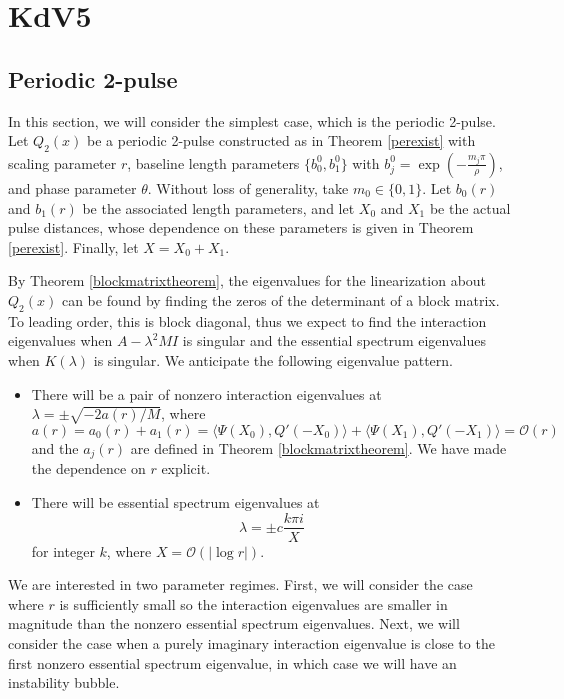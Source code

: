 \documentclass[thesis.tex]{subfiles}
\begin{document}
\chapter{KdV5}

\section{Periodic 2-pulse}

In this section, we will consider the simplest case, which is the periodic 2-pulse. Let $Q_2(x)$ be a periodic 2-pulse constructed as in Theorem \ref{perexist} with scaling parameter $r$, baseline length parameters $\{b_0^0, b_1^0 \}$ with $b_j^0 = \exp\left(-\frac{m_j \pi}{\rho}\right)$, and phase parameter $\theta$. Without loss of generality, take $m_0 \in \{0, 1\}$. Let $b_0(r)$ and $b_1(r)$ be the associated length parameters, and let $X_0$ and $X_1$ be the actual pulse distances, whose dependence on these parameters is given in Theorem \ref{perexist}. Finally, let $X = X_0 + X_1$.  

By Theorem \ref{blockmatrixtheorem}, the eigenvalues for the linearization about $Q_2(x)$ can be found by finding the zeros of the determinant of a block matrix. To leading order, this is block diagonal, thus we expect to find the interaction eigenvalues when $A - \lambda^2 M I$ is singular and the essential spectrum eigenvalues when $K(\lambda)$ is singular. We anticipate the following eigenvalue pattern.
\begin{itemize}
\item There will be a pair of nonzero interaction eigenvalues at $\lambda = \pm \sqrt{-2a(r)/M}$, where 
\[
a(r) = a_0(r) + a_1(r) = \langle \Psi(X_0), Q'(-X_0) \rangle + \langle \Psi(X_1), Q'(-X_1) \rangle = \mathcal{O}(r)
\]
and the $a_j(r)$ are defined in Theorem \ref{blockmatrixtheorem}. We have made the dependence on $r$ explicit.
\item There will be essential spectrum eigenvalues at
\[
\lambda = \pm c \frac{k \pi i}{X}
\]
for integer $k$, where $X = \mathcal{O}(|\log r|)$.
\end{itemize}

We are interested in two parameter regimes. First, we will consider the case where $r$ is sufficiently small so the interaction eigenvalues are smaller in magnitude than the nonzero essential spectrum eigenvalues. Next, we will consider the case when a purely imaginary interaction eigenvalue is close to the first nonzero essential spectrum eigenvalue, in which case we will have an instability bubble.
\end{document}
